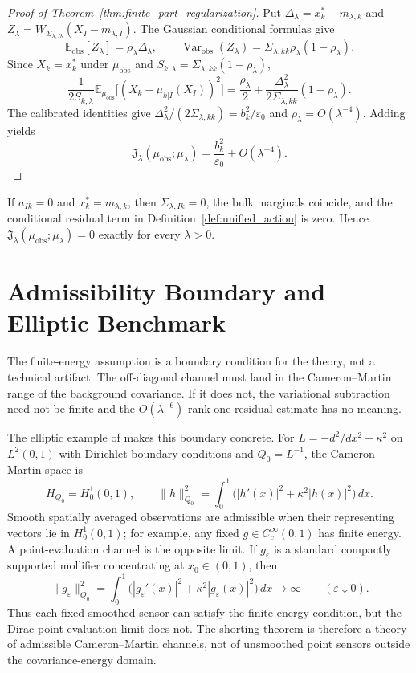 \begin{proof}[Proof of Theorem~\ref{thm:finite_part_regularization}]
Put $\Delta_\lambda=x_k^*-m_{\lambda,k}$ and
$Z_\lambda=W_{\Sigma_{\lambda,Ik}}(X_I-m_{\lambda,I})$.  The Gaussian
conditional formulas give
\[
  \mathbb{E}_{\mathrm{obs}}[Z_\lambda]
  =\rho_\lambda\Delta_\lambda,
  \qquad
  \operatorname{Var}_{\mathrm{obs}}(Z_\lambda)
  =
  \Sigma_{\lambda,kk}\rho_\lambda(1-\rho_\lambda).
\]
Since $X_k=x_k^*$ under $\mu_{\mathrm{obs}}$ and
$S_{k,\lambda}=\Sigma_{\lambda,kk}(1-\rho_\lambda)$,
\[
  \frac{1}{2S_{k,\lambda}}
  \mathbb{E}_{\mu_{\mathrm{obs}}}
  \bigl[(X_k-\mu_{k|I}(X_I))^2\bigr]
  =
  \frac{\rho_\lambda}{2}
  +
  \frac{\Delta_\lambda^2}{2\Sigma_{\lambda,kk}}(1-\rho_\lambda).
\]
The calibrated identities give
$\Delta_\lambda^2/(2\Sigma_{\lambda,kk})=b_k^2/\varepsilon_0$ and
$\rho_\lambda=O(\lambda^{-4})$.  Adding
 yields
\[
  \mathfrak{J}_\lambda(\mu_{\mathrm{obs}};\mu_\lambda)
  =
  \frac{b_k^2}{\varepsilon_0}+O(\lambda^{-4}).
\]
\end{proof}

If $a_{Ik}=0$ and $x_k^*=m_{\lambda,k}$, then
$\Sigma_{\lambda,Ik}=0$, the bulk marginals coincide, and the conditional
residual term in Definition~\ref{def:unified_action} is zero.  Hence
$\mathfrak{J}_\lambda(\mu_{\mathrm{obs}};\mu_\lambda)=0$ exactly for every
$\lambda>0$.

\section{Admissibility Boundary and Elliptic Benchmark}
\label{app:admissibility_boundary}

The finite-energy assumption is a boundary condition for the theory, not a
technical artifact.  The off-diagonal channel must land in the Cameron--Martin
range of the background covariance.  If it does not, the variational subtraction
need not be finite and the $O(\lambda^{-6})$ rank-one residual estimate has no
meaning.

The elliptic example of  makes this boundary concrete.  For
$L=-d^2/dx^2+\kappa^2$ on $L^2(0,1)$ with Dirichlet boundary conditions and
$Q_0=L^{-1}$, the Cameron--Martin space is
\[
  H_{Q_0}=H_0^1(0,1),
  \qquad
  \|h\|_{Q_0}^2
  =
  \int_0^1\bigl(|h'(x)|^2+\kappa^2|h(x)|^2\bigr)\,dx .
\]
Smooth spatially averaged observations are admissible when their representing
vectors lie in $H_0^1(0,1)$; for example, any fixed
$g\in C_c^\infty(0,1)$ has finite energy.  A point-evaluation channel is the
opposite limit.  If $g_\varepsilon$ is a standard compactly supported mollifier
concentrating at $x_0\in(0,1)$, then
\[
  \|g_\varepsilon\|_{Q_0}^2
  =
  \int_0^1\bigl(|g_\varepsilon'(x)|^2+\kappa^2|g_\varepsilon(x)|^2\bigr)\,dx
  \longrightarrow \infty
  \qquad(\varepsilon\downarrow0).
\]
Thus each fixed smoothed sensor can satisfy the finite-energy condition, but
the Dirac point-evaluation limit does not.  The shorting theorem is therefore a
theory of admissible Cameron--Martin channels, not of unsmoothed point sensors
outside the covariance-energy domain.
